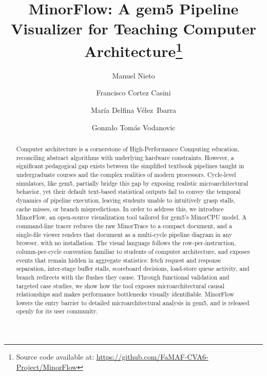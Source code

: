 \documentclass[runningheads,a4paper]{llncs}
\begin{document}
\title{MinorFlow: A gem5 Pipeline Visualizer for Teaching Computer Architecture\thanks{\footnotesize{Source code available at: \url{https://github.com/FaMAF-CVA6-Project/MinorFlow}}}}

\author{Manuel Nieto \and
Francisco Cortez Casini \and
María Delfina {Vélez~Ibarra} \and 
Gonzalo Tomás Vodanovic}



\maketitle

\begin{abstract}
Computer architecture is a cornerstone of High-Performance Computing education, reconciling abstract algorithms with underlying hardware constraints. However, a significant pedagogical gap exists between the simplified textbook pipelines taught in undergraduate courses and the complex realities of modern processors. Cycle-level simulators, like gem5, partially bridge this gap by exposing realistic microarchitectural behavior, yet their default text-based statistical outputs fail to convey the temporal dynamics of pipeline execution, leaving students unable to intuitively grasp stalls, cache misses, or branch mispredictions. In order to address this, we introduce MinorFlow, an open-source visualization tool tailored for gem5's MinorCPU model. A command-line tracer reduces the raw MinorTrace to a compact document, and a single-file viewer renders that document as a multi-cycle pipeline diagram in any browser, with no installation. The visual language follows the row-per-instruction, column-per-cycle convention familiar to students of computer architecture, and exposes events that remain hidden in aggregate statistics: fetch request and response separation, inter-stage buffer stalls, scoreboard decisions, load-store queue activity, and branch redirects with the flushes they cause. Through functional validation and targeted case studies, we show how the tool exposes microarchitectural causal relationships and makes performance bottlenecks visually identifiable. MinorFlow lowers the entry barrier to detailed microarchitectural analysis in gem5, and is released openly for its user community.

\end{abstract}
\end{document}
